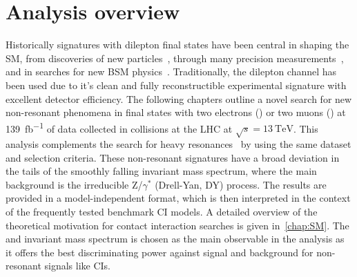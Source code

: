 \chapter{Analysis overview}\label{chap:analyintro}


Historically signatures with dilepton final states have been central in shaping the SM, from discoveries of new particles~\cite{PhysRevLett.33.1404, PhysRevLett.33.1406,1977PhRvL..39..252H,1983398,BAGNAIA1983130}, through many precision measurements~\cite{ALEPH:2005ab,Aad:2016zzw,Aad:2016izn,Sirunyan:2018swq}, and in searches for new BSM physics~\cite{Aad:2019fac,Sirunyan:2018exx,Sirunyan:2018ipj,EXOT-2016-05}. Traditionally, the dilepton channel has been used due to it's clean and fully reconstructible experimental signature with excellent detector efficiency. The following chapters outline a novel search for new non-resonant phenomena in final states with two electrons (\ee) or two muons (\mumu) at \SI{139}{\femto\barn^{-1}} of data collected in \protonproton collisions at the LHC at $\sqrt{s}=\SI{13}{\tera\electronvolt}$. This analysis complements the search for heavy resonances~\cite{Aad:2019fac} by using the same dataset and selection criteria. These non-resonant signatures have a broad deviation in the tails of the smoothly falling invariant mass spectrum, where the main background is the irreducible Z/$\gamma^*$ (Drell-Yan, DY) process. The results are provided in a model-independent format, which is then interpreted in the context of the frequently tested benchmark CI models. A detailed overview of the theoretical motivation for contact interaction searches is given in~\cref{chap:SM}. The \ee and \mumu invariant mass spectrum is chosen as the main observable in the analysis as it offers the best discriminating power against signal and background for non-resonant signals like CIs. 

